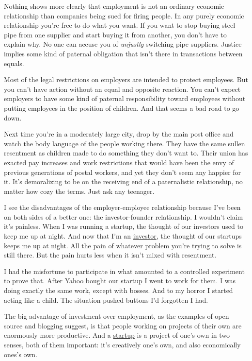 Nothing shows more clearly that employment is not an ordinary economic
relationship than companies being sued for firing people. In any purely
economic relationship you're free to do what you want. If you want to
stop buying steel pipe from one supplier and start buying it from
another, you don't have to explain why. No one can accuse you of
\emph{unjustly} switching pipe suppliers. Justice implies some kind of
paternal obligation that isn't there in transactions between equals.

Most of the legal restrictions on employers are intended to protect
employees. But you can't have action without an equal and opposite
reaction. You can't expect employers to have some kind of paternal
responsibility toward employees without putting employees in the
position of children. And that seems a bad road to go down.

Next time you're in a moderately large city, drop by the main post
office and watch the body language of the people working there. They
have the same sullen resentment as children made to do something they
don't want to. Their union has exacted pay increases and work
restrictions that would have been the envy of previous generations of
postal workers, and yet they don't seem any happier for it. It's
demoralizing to be on the receiving end of a paternalistic relationship,
no matter how cozy the terms. Just ask any teenager.

I see the disadvantages of the employer-employee relationship because
I've been on both sides of a better one: the investor-founder
relationship. I wouldn't claim it's painless. When I was running a
startup, the thought of our investors used to keep me up at night. And
now that I'm an \href{http://ycombinator.com}{investor}, the thought of
our startups keeps me up at night. All the pain of whatever problem
you're trying to solve is still there. But the pain hurts less when it
isn't mixed with resentment.

I had the misfortune to participate in what amounted to a controlled
experiment to prove that. After Yahoo bought our startup I went to work
for them. I was doing exactly the same work, except with bosses. And to
my horror I started acting like a child. The situation pushed buttons
I'd forgotten I had.

The big advantage of investment over employment, as the examples of open
source and blogging suggest, is that people working on projects of their
own are enormously more productive. And a \href{start.html}{startup} is
a project of one's own in two senses, both of them important: it's
creatively one's own, and also economically ones's own.

